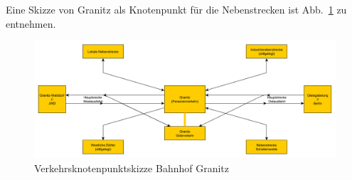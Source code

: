 Eine Skizze von Granitz als Knotenpunkt für die Nebenstrecken ist Abb.~\ref{img:sketch_side_tracks} zu entnehmen.
\begin{figure}[h]
\centering
  \includegraphics[width=1.0\textwidth]{img/map_evolution/sketch_side_tracks.pdf}
	\caption{Verkehrsknotenpunktskizze Bahnhof Granitz}
	\label{img:sketch_side_tracks}
\end{figure}

